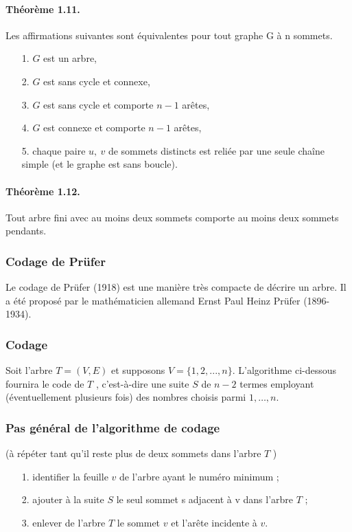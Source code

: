 \paragraph*{Théorème 1.11.}
Les affirmations suivantes sont équivalentes pour tout graphe G à n sommets.
\begin{itemize}
	\item[1.] $ G $ est un arbre,
	\item[2.] $ G $ est sans cycle et connexe,
	\item[3.] $ G $ est sans cycle et comporte $ n - 1 $ arêtes,
	\item[4.] $ G $ est connexe et comporte $ n - 1 $ arêtes,
	\item[5.] chaque paire $ u,\ v $ de sommets distincts est reliée par une seule chaîne simple (et
	le graphe est sans boucle).
\end{itemize}

\paragraph*{Théorème 1.12.}
Tout arbre fini avec au moins deux sommets comporte au moins deux sommets
pendants.

\subsubsection*{Codage de Prüfer\\}
Le codage de Prüfer (1918) est une manière très compacte de décrire un arbre. Il a été
proposé par le mathématicien allemand Ernst Paul Heinz Prüfer (1896-1934).

\subsubsection*{Codage\\}
Soit l'arbre $ T = (V, E) $ et supposons $ V = \{1, 2, . . . , n \}. $
L'algorithme ci-dessous fournira le code de $ T $ , c'est-à-dire une suite $ S $ de $ n - 2 $ termes
employant (éventuellement plusieurs fois) des nombres choisis parmi $ 1,\dots , n $.
\subsubsection*{Pas général de l'algorithme de codage}
(à répéter tant qu'il reste plus de deux sommets dans l'arbre $ T $ )

\begin{itemize}
	\item[1.] identifier la feuille $ v $ de l'arbre ayant le numéro minimum ;
	\item[2.] ajouter à la suite $ S $ le seul sommet s adjacent à v dans l'arbre $ T $ ;
	\item[3.] enlever de l'arbre $ T $ le sommet $ v $ et l'arête incidente à $ v $.
\end{itemize}

